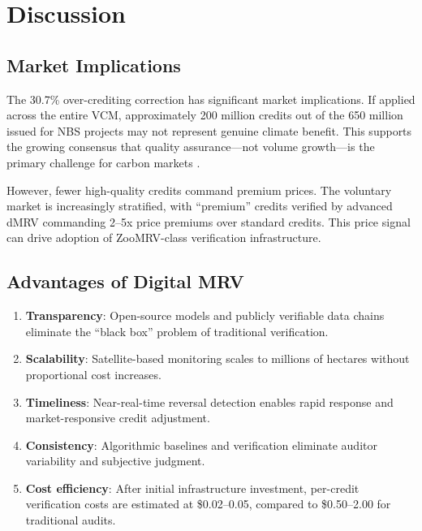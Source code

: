 \section{Discussion}

\label{sec:discussion}

\subsection{Market Implications}

The 30.7\% over-crediting correction has significant market implications.
If applied across the entire VCM, approximately 200 million credits out
of the 650 million issued for NBS projects may not represent genuine
climate benefit. This supports the growing consensus that quality
assurance---not volume growth---is the primary challenge for carbon
markets \citep{badgley2022}.

However, fewer high-quality credits command premium prices. The voluntary
market is increasingly stratified, with ``premium'' credits verified by
advanced dMRV commanding 2--5x price premiums over standard credits.
This price signal can drive adoption of ZooMRV-class verification
infrastructure.

\subsection{Advantages of Digital MRV}

\begin{enumerate}
  \item \textbf{Transparency}: Open-source models and publicly
    verifiable data chains eliminate the ``black box'' problem of
    traditional verification.
  \item \textbf{Scalability}: Satellite-based monitoring scales to
    millions of hectares without proportional cost increases.
  \item \textbf{Timeliness}: Near-real-time reversal detection enables
    rapid response and market-responsive credit adjustment.
  \item \textbf{Consistency}: Algorithmic baselines and verification
    eliminate auditor variability and subjective judgment.
  \item \textbf{Cost efficiency}: After initial infrastructure
    investment, per-credit verification costs are estimated at
    \$0.02--0.05, compared to \$0.50--2.00 for traditional audits.
\end{enumerate}

